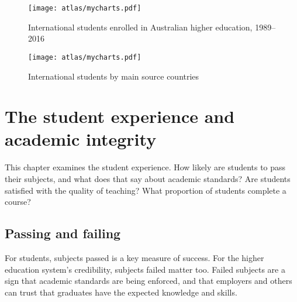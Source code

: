 \documentclass{grattan}
\begin{document}
    \begin{figure} %
    \caption{International students enrolled in Australian higher education, 1989--2016}\label{fig:international-students-enrolled-in-australian-higher-education-19892016}
    \texttt{[image: atlas/mycharts.pdf]}
    \end{figure}




    \begin{figure} %
    \caption{International students by main source countries}\label{fig:international-students-by-main-source-countries}
    \texttt{[image: atlas/mycharts.pdf]}
    \end{figure}



%
\chapter{The student experience and academic integrity}\label{chap:the-student-experience-and-academic-integrity}

%


This chapter examines the student experience. How likely are students to pass their subjects, and what does that say about academic standards? Are students satisfied with the quality of teaching? What proportion of students complete a course?

%
\section{Passing and failing }\label{sec:passing-and-failing}

For students, subjects passed is a key measure of success. For the higher education system's credibility, subjects failed matter too. Failed subjects are a sign that academic standards are being enforced, and that employers and others can trust that graduates have the expected knowledge and skills.
\end{document}
